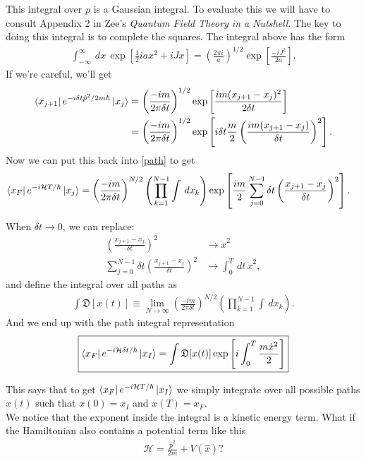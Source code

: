 \documentclass{book}
\theoremstyle{definition}
\newcommand{\ham}{\mathcal{H}}
\newcommand{\f}[2]{\frac{#1}{#2}}
\newcommand{\lp}{\left(}
\newcommand{\rp}{\right)}
\newcommand{\lb}{\left[}
\newcommand{\rb}{\right]}
\begin{document}
This integral over $p$ is a Gaussian integral. To evaluate this we will have to consult Appendix 2 in Zee's \textit{Quantum Field Theory in a Nutshell}. The key to doing this integral is to complete the squares. The integral above has the form
\begin{align}
\int_{-\infty}^\infty \,dx\, \exp\lb \f{1}{2}iax^2 + iJx \rb = \lp \f{2\pi i}{a} \rp^{1/2}\exp\lb \f{-iJ^2}{2a} \rb.
\end{align}
If we're careful, we'll get
\begin{align}
\bra{x_{j+1}}e^{-i\delta t \hat{p}^2/2m\hbar}\ket{x_j} &= \lp \f{-im}{2\pi\delta t} \rp^{1/2} \exp\lb \f{im(x_{j+1} - x_j)^2}{2\delta t} \rb \\ 
&= \lp \f{-im}{2\pi\delta t} \rp^{1/2} \exp\lb i\delta t \f{m}{2} \lp \f{im(x_{j+1} - x_j)}{\delta t} \rp^2  \rb.
\end{align}
Now we can put this back into \eqref{path} to get
\begin{align}
\bra{x_F}e^{-i\ham T/\hbar}\ket{x_j} &= \lp \f{-im}{2\pi\delta t} \rp^{N/2} \lp\prod_{k=1}^{N-1}\int \,dx_k \rp \exp\lb \f{i m}{2} \sum_{j=0}^{N-1} \delta t \lp \f{x_{j+1} - x_j}{\delta t} \rp^2\rb.
\end{align}

When $\delta t \to 0$, we can replace:
\begin{align}
\lp \f{x_{j+1} - x_j}{\delta t} \rp^2 &\to \dot{x}^2\\
\sum_{j=0}^{N-1} \delta t \lp \f{x_{j+1} - x_j}{\delta t} \rp^2 &\to \int_{0}^T \,dt\, \dot{x}^2,
\end{align}
and define the integral over all paths as
\begin{align}
\int \mathfrak{D}[x(t)]\equiv \lim_{N\to \infty}\lp \f{-im}{2\pi\delta t} \rp^{N/2} \lp\prod_{k=1}^{N-1}\int \,dx_k\rp.
\end{align}
And we end up with the path integral representation
\begin{align}
\boxed{\bra{x_F}e^{-i\ham \delta t / \hbar} \ket{x_I} = \int \mathfrak{D}[x(t)] \exp \lb i \int_0^T \f{m\dot{x}^2}{2} \rb}
\end{align}


This says that to get $\bra{x_F}e^{-i\ham T/\hbar}\ket{x_I}$ we simply integrate over all possible paths $x(t)$ such that $x(0) = x_I$ and $x(T) = x_F$. \\


We notice that the exponent inside the integral is a kinetic energy term. What if the Hamiltonian also contains a potential term like this
\begin{align}
\ham = \f{\hat{p}^2}{2m} + V(\hat{x})?
\end{align}
\end{document}
